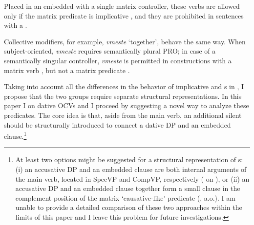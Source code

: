 \documentclass[output=paper,colorlinks,citecolor=brown,newtxmath]{langsci/langscibook}
\begin{document}
\noindent Placed in an embedded  with a single matrix controller, these verbs are allowed only if the matrix predicate is implicative , and they are prohibited in sentences with a  .

\ea\label{ex11}
\z
\z

\noindent Collective modifiers, for example, \textit{vmeste} `together’, behave the same way. When subject-oriented, \textit{vmeste} requires semantically plural PRO; in case of a semantically singular controller, \textit{vmeste} is permitted in constructions with a matrix  verb , but not a matrix  predicate .

\ea\label{ex12}
\z
\z

\noindent Taking into account all the differences in the behavior of implicative and s in , I propose that the two groups require separate structural representations. In this paper I  on  dative OCVs and I proceed by suggesting a novel way to analyze these predicates. The core idea is that, aside from the main verb, an additional silent   should be structurally introduced to connect a dative DP and an embedded clause.\footnote{At least two options might be suggested for a structural representation of s: (i) an accusative DP and an embedded clause are both internal arguments of the main verb, located in SpecVP and CompVP, respectively (\citealt{Babby1998, bailyn2012} on ), or (ii) an accusative DP and an embedded clause together form a small clause in the complement position of the matrix `causative-like’ predicate (\citealt{FranksHornstein1992, Landau2015}, a.o.). I am unable to provide a detailed comparison of these two approaches within the limits of this paper and I leave this problem for future investigations.}
\end{document}
